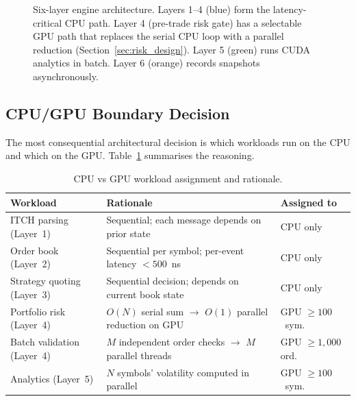 \documentclass[12pt]{article}
\begin{document}
\begin{figure}[h]
\caption{Six-layer engine architecture. Layers 1--4 (blue) form the
  latency-critical CPU path. Layer 4 (pre-trade risk gate) has a
  selectable GPU path that replaces the serial CPU loop with a
  parallel reduction (Section~\ref{sec:risk_design}).
  Layer 5 (green) runs CUDA analytics in batch.
  Layer 6 (orange) records snapshots asynchronously.}
\label{fig:arch_pipeline}
\end{figure}

\subsection{CPU/GPU Boundary Decision}
\label{sec:cpugpu}

The most consequential architectural decision is which workloads run on
the CPU and which on the GPU.
Table~\ref{tab:cpugpu} summarises the reasoning.

\begin{table}[H]
\centering
\small
\caption{CPU vs GPU workload assignment and rationale.}
\label{tab:cpugpu}
\begin{tabularx}{\textwidth}{@{}p{3.2cm}Xp{2.4cm}@{}}
\toprule
\textbf{Workload} & \textbf{Rationale} & \textbf{Assigned to} \\
\midrule
ITCH parsing (Layer~1) & Sequential; each message depends on prior state &
  CPU only \\[2pt]
Order book (Layer~2) & Sequential per symbol; per-event latency $<500$~ns &
  CPU only \\[2pt]
Strategy quoting (Layer~3) & Sequential decision; depends on current book state &
  CPU only \\[2pt]
Portfolio risk (Layer~4) & $O(N)$ serial sum $\to$ $O(1)$ parallel reduction on GPU &
  GPU $\geq 100$~sym. \\[2pt]
Batch validation (Layer~4) & $M$ independent order checks $\to$ $M$ parallel threads &
  GPU $\geq 1{,}000$ ord. \\[2pt]
Analytics (Layer~5) & $N$ symbols' volatility computed in parallel &
  GPU $\geq 100$~sym. \\
\bottomrule
\end{tabularx}
\end{table}
\end{document}
